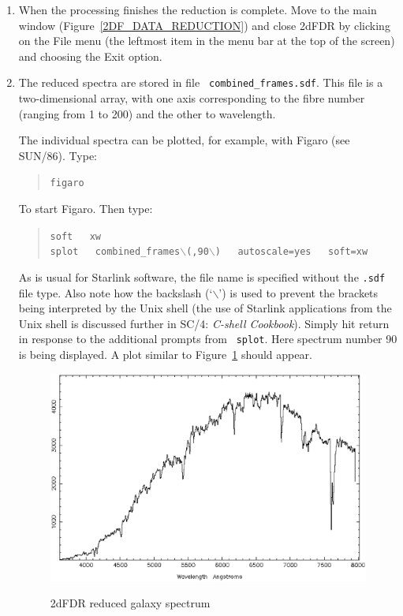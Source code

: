 \documentclass[twoside,11pt]{article}
\newcommand{\xref}[3]{#1}
\begin{document}
\begin{enumerate}
  \item When the processing finishes the reduction is complete.  Move
   to the main window (Figure~\ref{2DF_DATA_REDUCTION}) and close
   2dFDR by clicking on the {\sf File} menu (the leftmost item in the
   menu bar at the top of the screen) and choosing the {\sf Exit}
   option.

  \item The reduced spectra are stored in file {\tt
   combined\_frames.sdf}.  This file is a two-dimensional array, with one
   axis corresponding to the fibre number (ranging from 1 to 200) and the
   other to wavelength.

   The individual spectra can be plotted, for example, with Figaro
   (see \xref{SUN/86}{sun86}{}\cite{SUN86}).  Type:

  \begin{quote}
   {\tt figaro}
  \end{quote}

   To start Figaro.  Then type:

  \begin{quote}
   {\tt soft ~ xw \\
   splot ~ combined\_frames$\backslash$(,90$\backslash$) ~
    autoscale=yes ~ soft=xw}
  \end{quote}

   As is usual for Starlink software, the file name is specified without
   the {\tt .sdf} file type.  Also note how the backslash (`$\backslash$')
   is used to prevent the brackets being interpreted by the Unix shell
   (the use of Starlink applications from the Unix shell is discussed
   further in \xref{SC/4: {\it C-shell Cookbook}}{sc4}{}\/\cite{SC4}).
   Simply hit return in response to the additional prompts from {\tt
   splot}.  Here spectrum number 90 is being displayed.  A plot similar
   to Figure~\ref{2DF_SPLOT} should appear.

  \begin{figure}[htbp]
     \centering
     \includegraphics[totalheight=3.6in]{sc14_2df_splot.ps}
     \begin{quote}
     \caption{2dFDR reduced galaxy spectrum
     \label{2DF_SPLOT} }
     \end{quote}
  \end{figure}

\end{enumerate}
\end{document}
